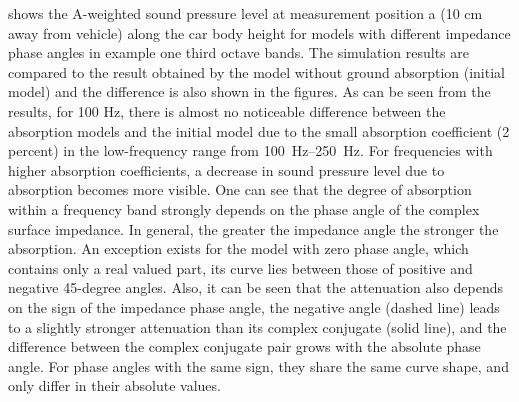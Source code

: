 \noindent {} shows the A-weighted sound pressure level at measurement position a (10 cm away from vehicle) along the car body height for models with different impedance phase angles in example one third octave bands. The simulation results are compared to the result obtained by the model without ground absorption (initial model) and the difference is also shown in the figures. %
As can be seen from the results, for 100 Hz, there is almost no noticeable difference between the absorption models and the initial model due to the small absorption coefficient (2 percent) in the low-frequency range from \SIrange{100}{250}{\hertz}. For frequencies with higher absorption coefficients, a decrease in sound pressure level due to absorption becomes more visible. One can see that the degree of absorption within a frequency band strongly depends on the phase angle of the complex surface impedance. In general, the greater the impedance angle the stronger the absorption. An exception exists for the model with zero phase angle, which contains only a real valued part, its curve lies between those of positive and negative 45-degree angles. Also, it can be seen that the attenuation also depends on the sign of the impedance phase angle, the negative angle (dashed line) leads to a slightly stronger attenuation than its complex conjugate (solid line), and the difference between the complex conjugate pair grows with the absolute phase angle. For phase angles with the same sign, they share the same curve shape, and only differ in their absolute values.

